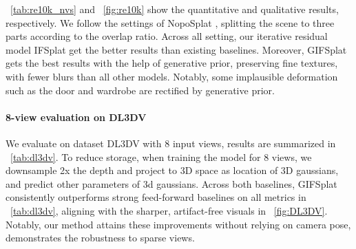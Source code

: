 ~\cref{tab:re10k_nvs} and ~\cref{fig:re10k} show the quantitative and qualitative results, respectively. We follow the settings of NopoSplat \cite{ye2024no}, splitting the scene to three parts according to the overlap ratio. Across all setting, our iterative residual model IFSplat get the better results than existing baselines. Moreover, GIFSplat gets the best results with the help of generative prior, preserving fine textures, with fewer blurs than all other models. Notably, some implausible deformation such as the door and wardrobe are rectified by generative prior. %


\paragraph{8-view evaluation on DL3DV}

We evaluate on dataset DL3DV with 8 input views, results are summarized in ~\cref{tab:dl3dv}. To reduce storage, when training the model for 8 views, we downsample 2x the depth and project to 3D space as location of 3D gaussians, and predict other parameters of 3d gaussians.
Across both baselines, GIFSplat consistently outperforms strong feed-forward baselines on all metrics in ~\cref{tab:dl3dv}, aligning with the sharper, artifact-free visuals in ~\cref{fig:DL3DV}.
Notably, our method attains these improvements without relying on camera pose, demonstrates the robustness to sparse views.


